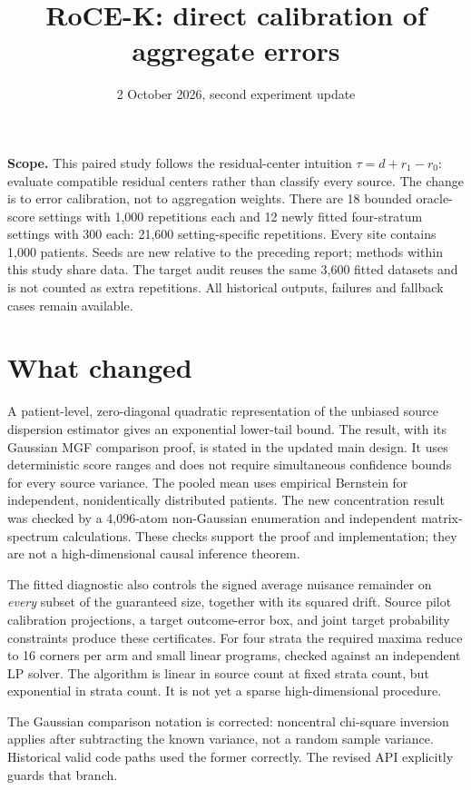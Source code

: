 \documentclass[11pt]{article}
\title{RoCE-K: direct calibration of aggregate errors}
\author{}\date{2 October 2026, second experiment update}
\begin{document}
\maketitle

\textbf{Scope.} This paired study follows the residual-center intuition
$\tau=d+r_1-r_0$: evaluate compatible residual centers rather than classify
every source. The change is to error calibration, not to aggregation weights.
There are 18 bounded oracle-score settings with 1,000 repetitions each and
12 newly fitted four-stratum settings with 300 each: 21,600 setting-specific
repetitions. Every site contains 1,000 patients. Seeds are new relative to the
preceding report; methods within this study share data. The target audit
reuses the same 3,600 fitted datasets and is not counted as extra repetitions.
All historical outputs, failures and fallback cases remain available.

\section{What changed}

A patient-level, zero-diagonal quadratic representation of the unbiased
source dispersion estimator gives an exponential lower-tail bound. The
result, with its Gaussian MGF comparison proof, is stated in the updated
main design. It uses deterministic score ranges and does not require
simultaneous confidence bounds for every source variance. The pooled mean
uses empirical Bernstein for independent, nonidentically distributed patients.
The new concentration result was checked by a 4,096-atom non-Gaussian
enumeration and independent matrix-spectrum calculations. These checks
support the proof and implementation; they are not a high-dimensional
causal inference theorem.

The fitted diagnostic also controls the signed average nuisance remainder
on \emph{every} subset of the guaranteed size, together with its squared
drift. Source pilot calibration projections, a target outcome-error box,
and joint target probability constraints produce these certificates.
For four strata the required maxima reduce to 16 corners per arm and small
linear programs, checked against an independent LP solver. The algorithm
is linear in source count at fixed strata count, but exponential in strata
count. It is not yet a sparse high-dimensional procedure.

The Gaussian comparison notation is corrected: noncentral chi-square
inversion applies after subtracting the known variance, not a random sample
variance. Historical valid code paths used the former correctly. The revised
API explicitly guards that branch.
\end{document}

